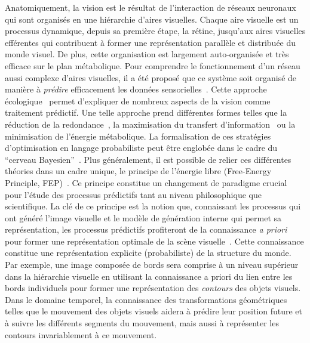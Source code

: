 Anatomiquement, la vision est le résultat de l'interaction de réseaux
neuronaux qui sont organisés en une hiérarchie d'aires visuelles.
Chaque aire visuelle est un processus dynamique, depuis sa
première étape, la rétine, jusqu'aux aires visuelles efférentes qui
contribuent à former une représentation parallèle et distribuée du monde
visuel. De plus, cette organisation est largement auto-organisée et très
efficace sur le plan métabolique. Pour comprendre le fonctionnement d'un réseau aussi
complexe d'aires visuelles, il a été proposé que ce système soit
organisé de manière à \emph{prédire} efficacement les données
sensorielles~\citep{Attneave54}. Cette approche écologique~\citep{Atick92}
permet d'expliquer de nombreux aspects de la vision comme traitement
prédictif. Une telle approche prend différentes formes telles que la
réduction de la redondance~\citep{Barlow61}, la maximisation du transfert
d'information~\citep{Linsker90} ou la minimisation de l'énergie
métabolique. La formalisation de ces stratégies d'optimisation en
langage probabiliste peut être englobée dans le cadre du ``cerveau
Bayesien''~\citep{Knill04}. Plus généralement, il est possible de
relier ces différentes théories dans un cadre unique, le principe de
l'énergie libre (Free-Energy Principle, FEP)~\citep{Friston10}. Ce principe constitue un
changement de paradigme crucial pour l'étude des processus prédictifs
tant au niveau philosophique que scientifique. La clé de ce principe est
la notion que, connaissant les processus qui ont généré l'image visuelle
et le modèle de génération interne qui permet sa représentation, les
processus prédictifs profiteront de la connaissance \emph{a priori} pour
former une représentation optimale de la scène visuelle~\citep{Rao99}. Cette connaissance constitue une représentation explicite
(probabiliste) de la structure du monde. Par exemple, une image composée
de bords sera comprise à un niveau supérieur dans la hiérarchie visuelle en utilisant la
connaissance a priori du lien entre les bords individuels pour former
une représentation des \emph{contours} des objets visuels. Dans le
domaine temporel, la connaissance des transformations géométriques
telles que le mouvement des objets visuels aidera à prédire leur
position future et à suivre les différents segments du mouvement, mais aussi
à représenter les contours invariablement à ce mouvement.

